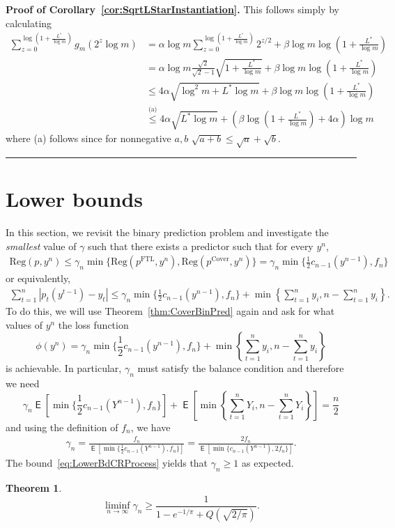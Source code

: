 \documentclass[11pt,letter]{article}
\newtheorem{theorem}{Theorem}
\newenvironment{proof}[1][Proof]{\noindent\textbf{#1.} }{\ \rule{0.5em}{0.5em}}
\newcommand{\g}{\gamma}
\newcommand{\Reg}{\mathrm{Reg}}
\newcommand{\pcov}{p^{\mathrm{Cover}}}
\newcommand{\pftl}{p^{\mathrm{FTL}}}
\DeclareMathOperator\E{\textsf{E}}
\begin{document}
\begin{proof}[Proof of Corollary~\ref{cor:SqrtLStarInstantiation}]
    This follows simply by calculating 
    \begin{align}
        \sum_{z=0}^{\log\left(1+\frac{L^*}{\log m}\right)} g_m(2^z \log m) &= \alpha\log m \sum_{z=0}^{\log\left(1+\frac{L^*}{\log m}\right)} 2^{z/2} + \beta \log m \log\left(1+\frac{L^*}{\log m}\right)\nonumber\\
        &= \alpha \log m \frac{\sqrt{2}}{\sqrt{2}-1}\sqrt{1+\frac{L^*}{\log m}} + \beta \log m \log\left(1+\frac{L^*}{\log m}\right) \nonumber \\
        &\le 4\alpha \sqrt{\log^2 m + L^* \log m} + \beta \log m \log\left(1+\frac{L^*}{\log m}\right) \nonumber\\
        &\stackrel{\text{(a)}}{\le} 4\alpha \sqrt{L^* \log m} + \left(\beta\log\left(1+\frac{L^*}{\log m}\right) + 4\alpha\right)\log m \nonumber
    \end{align}
    where (a) follows since for nonnegative $a,b$ $\sqrt{a+b} \le \sqrt{a}+ \sqrt{b}$.
\end{proof}
\section{Lower bounds}\label{sec:LBs}
In this section, we revisit the binary prediction problem and investigate the \emph{smallest} value of $\gamma$ such that there exists a predictor such that for every $y^n$,
\begin{align}
    \Reg(p, y^n) \le \g_n \min\{\Reg(\pftl,y^n),\Reg(\pcov,y^n)\} = \g_n \min\{\frac{1}{2}c_{n-1}(y^{n-1}), f_n\}
\end{align}
or equivalently, 
\begin{align}
   \sum_{t=1}^n |p_t(y^{t-1})-y_t| \le \g_n \min\{\frac{1}{2}c_{n-1}(y^{n-1}), f_n\} + \min\left\{\sum_{t=1}^n y_i, n-\sum_{t=1}^n y_i\right\}. 
\end{align}
To do this, we will use Theorem~\ref{thm:CoverBinPred} again and ask for what values of $y^n$ the loss function 
\[
\phi(y^n) = \g_n \min\{\frac{1}{2}c_{n-1}(y^{n-1}), f_n\} + \min\left\{\sum_{t=1}^n y_i, n-\sum_{t=1}^n y_i\right\}
\]
is achievable. In particular, $\g_n$ must satisfy the balance condition and therefore we need 
\[
\g_n\E[ \min\{\frac{1}{2}c_{n-1}(Y^{n-1}), f_n\}] + \E\left[ \min\left\{\sum_{t=1}^n Y_i, n-\sum_{t=1}^n Y_i\right\}\right] = \frac{n}{2} 
\]
and using the definition of $f_n$, we have 
\begin{align}\label{eq:LowerBdCRProcess}
    \g_n = \frac{f_n}{\E[ \min\{\frac{1}{2}c_{n-1}(Y^{n-1}), f_n\}]} =  \frac{2f_n}{\E[ \min\{c_{n-1}(Y^{n-1}), 2f_n\}]}.
\end{align}
The bound~\eqref{eq:LowerBdCRProcess} yields that $\g_n \ge 1$ as expected.
\begin{theorem}
    \[
    \liminf_{n \to \infty} \gamma_n \ge \frac{1}{1-e^{-1/\pi}+Q\left(\sqrt{2/\pi}\right)}.
    \]
\end{theorem}
\end{document}
